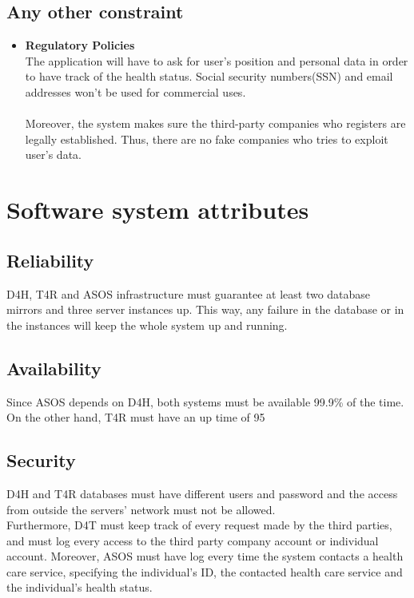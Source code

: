 \documentclass[hidelinks, 12pt]{report}
\begin{document}
\subsection{Any other constraint}
\begin{itemize}
\item{} \textbf{Regulatory Policies}\\
The application will have to ask for user's position and personal data in order to have track of the health status. Social security numbers(SSN) and email addresses won't be used for commercial uses.\\\\
Moreover, the system makes sure the third-party companies who registers are legally established. Thus, there are no fake companies who tries to exploit user's data. 
\end{itemize}
\section{Software system attributes}

\subsection{Reliability}
D4H, T4R and ASOS infrastructure must guarantee at least two database mirrors and three server instances up. This way, any failure in the database or in the instances will keep the whole system up and running. 

\subsection{Availability}
Since ASOS depends on D4H, both systems must be available 99.9\% of the time. On the other hand, T4R must have an up time of 95%

\subsection{Security}
D4H and T4R databases must have different users and password and the access from outside the servers' network must not be allowed.\\

Furthermore, D4T must keep track of every request made by the third parties, and must log every access to the third party company account or individual account. Moreover, ASOS must have log every time the system contacts a health care service, specifying the individual's ID, the contacted health care service and the individual's health status. \\
\end{document}
